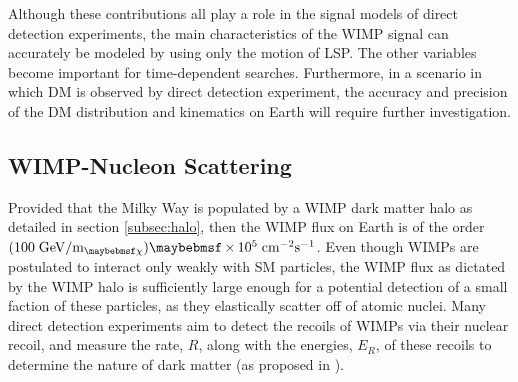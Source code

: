 Although these contributions all play a role in the signal models of direct detection experiments, the main characteristics of the WIMP signal can accurately be modeled by using only the motion of LSP. The other variables become important for time-dependent searches. Furthermore, in a scenario in which DM is observed by direct detection experiment, the accuracy and precision of the DM distribution and kinematics on Earth will require further investigation. 


\subsection{WIMP-Nucleon Scattering}
\label{subsec:scattering}

Provided that the Milky Way is populated by a WIMP dark matter halo as detailed in section \ref{subsec:halo}, then the WIMP flux on Earth is of the order $(100 \; \MathText{GeV}/\MathText{m}_{\chi}) \times 10^5  \; \MathText{cm}^{-2} \MathText{s}^{-1}$. Even though WIMPs are postulated to interact only weakly with SM particles, the WIMP flux as dictated by the WIMP halo is sufficiently large enough for a potential detection of a small faction of these particles, as they elastically scatter off of atomic nuclei. Many direct detection experiments aim to detect the recoils of WIMPs via their nuclear recoil, and measure the rate, $R$, along with the energies, $E_{R}$, of these recoils to determine the nature of dark matter (as proposed in  \cite{Detectability_of_dm}).

